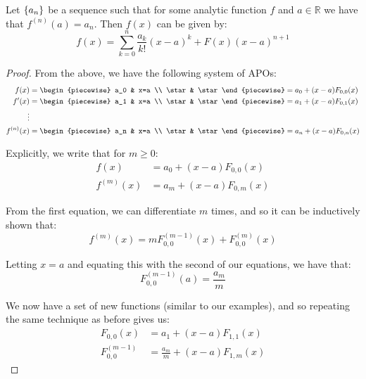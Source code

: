 \begin{theorem}
    \label{theorem:taylor_polynomial}
    Let $\{a_n\}$ be a sequence such that for some analytic function $f$ and $a\in\mathbb{R}$ we have that $f^{(n)}(a)=a_n$. Then $f(x)$ can be given by:
    $$
        f(x) = \sum_{k=0}^{n}{\frac{a_k}{k!}(x-a)^k}+F(x)(x-a)^{n+1}
    $$

    \begin{proof}
        From the above, we have the following system of APOs:
        \begin{align*}
            f(x) &= \begin{piecewise}
                a_0 & x=a \\
                \star & \star
            \end{piecewise} = a_0 + (x-a)F_{0,0}(x) \\
            f'(x) &= \begin{piecewise}
                a_1 & x=a \\
                \star & \star
            \end{piecewise} = a_1 + (x-a)F_{0,1}(x) \\
            \vdots \\
            f^{(n)}(x) &= \begin{piecewise}
                a_n & x=a \\
                \star & \star
            \end{piecewise} = a_n + (x-a)F_{0,n}(x) \\
        \end{align*}

        Explicitly, we write that for $m\geq 0$:
        \begin{align*}
            f(x) &= a_0 + (x-a)F_{0,0}(x) \\
            f^{(m)}(x) &= a_m + (x-a)F_{0,m}(x)
        \end{align*}

        From the first equation, we can differentiate $m$ times, and so it can be inductively shown that:
        $$
            f^{(m)}(x) = mF^{(m-1)}_{0,0}(x)+F^{(m)}_{0,0}(x)
        $$

        Letting $x=a$ and equating this with the second of our equations, we have that:
        $$
            F^{(m-1)}_{0,0}(a)=\frac{a_m}{m}
        $$

        We now have a set of new functions (similar to our examples), and so repeating the same technique as before gives us:
        \begin{align*}
            F_{0,0}(x) &= a_1 + (x-a)F_{1,1}(x) \\
            F^{(m-1)}_{0,0} &= \frac{a_m}{m} + (x-a)F_{1,m}(x)
        \end{align*}


\end{proof}
\end{theorem}
